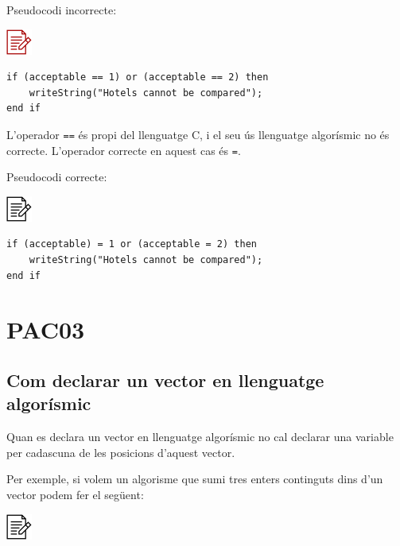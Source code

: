 \documentclass[
]{book}
\begin{document}
Pseudocodi incorrecte:

\includegraphics{./img/alg_err.png}

\begin{verbatim}
if (acceptable == 1) or (acceptable == 2) then
    writeString("Hotels cannot be compared");
end if
\end{verbatim}

L'operador \texttt{==} és propi del llenguatge C, i el seu ús llenguatge algorísmic no és correcte. L'operador correcte en aquest cas és \texttt{=}.

Pseudocodi correcte:

\includegraphics{./img/alg.png}

\begin{verbatim}
if (acceptable) = 1 or (acceptable = 2) then
    writeString("Hotels cannot be compared");
end if
\end{verbatim}

\hypertarget{pac03}{%
\chapter{PAC03}\label{pac03}}

\hypertarget{com-declarar-un-vector-en-llenguatge-algoruxedsmic}{%
\section{Com declarar un vector en llenguatge algorísmic}\label{com-declarar-un-vector-en-llenguatge-algoruxedsmic}}

Quan es declara un vector en llenguatge algorísmic no cal declarar una variable per cadascuna de les posicions d'aquest vector.

Per exemple, si volem un algorisme que sumi tres enters continguts dins d'un vector podem fer el següent:

\includegraphics{./img/alg.png}
\end{document}
